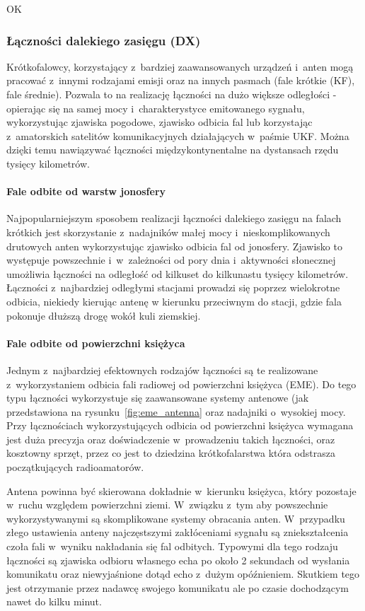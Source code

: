 \documentclass[]{mgr}
\begin{document}
OK
                \subsubsection{Łączności dalekiego zasięgu (DX)}
                Krótkofalowcy, korzystający z~bardziej zaawansowanych urządzeń i~anten mogą pracować z~innymi rodzajami emisji oraz na innych pasmach (fale krótkie (KF), fale średnie). Pozwala to na realizację łączności na dużo większe odległości - opierając się na samej mocy i~charakterystyce emitowanego sygnału, wykorzystując zjawiska pogodowe, zjawisko odbicia fal lub korzystając z~amatorskich satelitów komunikacyjnych działających w~paśmie UKF. Można dzięki temu nawiązywać łączności międzykontynentalne na dystansach rzędu tysięcy kilometrów.

                    \paragraph{Fale odbite od warstw jonosfery}
                    Najpopularniejszym sposobem realizacji łączności dalekiego zasięgu na falach krótkich jest skorzystanie z~nadajników małej mocy i~nieskomplikowanych drutowych anten wykorzystując zjawisko odbicia fal od jonosfery. Zjawisko to występuje powszechnie i~w~zależności od pory dnia i~aktywności słonecznej umożliwia łączności na odległość od kilkuset do kilkunastu tysięcy kilometrów. Łączności z~najbardziej odległymi stacjami prowadzi się poprzez wielokrotne odbicia, niekiedy kierując antenę w kierunku przeciwnym do stacji, gdzie fala pokonuje dłuższą drogę wokół kuli ziemskiej.

                    \paragraph{Fale odbite od powierzchni księżyca}
                    Jednym z~najbardziej efektownych rodzajów łączności są te realizowane z~wykorzystaniem odbicia fali radiowej od powierzchni księżyca (EME). Do tego typu łączności wykorzystuje się zaawansowane systemy antenowe (jak przedstawiona na rysunku~\ref{fig:eme_antenna} oraz nadajniki o~wysokiej mocy. Przy łącznościach wykorzystujących odbicia od powierzchni księżyca wymagana jest duża precyzja oraz doświadczenie w~prowadzeniu takich łączności, oraz kosztowny sprzęt, przez co jest to dziedzina krótkofalarstwa która odstrasza początkujących radioamatorów. 

                    Antena powinna być skierowana dokładnie w~kierunku księżyca, który pozostaje w~ruchu względem powierzchni ziemi. W~związku z~tym aby powszechnie wykorzystywanymi są skomplikowane systemy obracania anten. W~przypadku złego ustawienia anteny najczęstszymi zakłóceniami sygnału są zniekształcenia czoła fali w~wyniku nakładania się fal odbitych. Typowymi dla tego rodzaju łączności są zjawiska odbioru własnego echa po około 2 sekundach od wysłania komunikatu oraz niewyjaśnione dotąd echo z~dużym opóźnieniem. Skutkiem tego jest otrzymanie przez nadawcę swojego komunikatu ale po czasie dochodzącym nawet do kilku minut.
\end{document}
